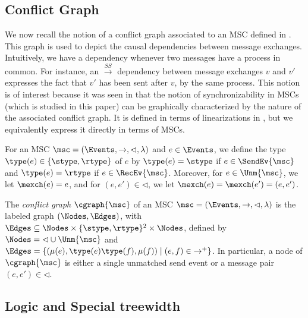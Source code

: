 \subsection{Conflict Graph}


We now recall the notion of a conflict graph associated to an MSC defined in \cite{DBLP:conf/cav/BouajjaniEJQ18}. This graph is used to depict the causal dependencies between message exchanges.  Intuitively, we have a dependency whenever
two messages have a process in common. For instance, an $\xrightarrow{SS}$
dependency between message exchanges $v$ and $v'$ expresses the fact that
$v'$ has been sent after $v$, by the same process. This notion is of interest because it was seen in \cite{DBLP:conf/cav/BouajjaniEJQ18} that the notion of synchronizability in MSCs (which is studied in this paper) can be graphically characterized by the nature of the associated conflict graph.
It is defined in terms of linearizations
in \cite{DBLP:conf/fossacs/GiustoLL20}, but we equivalently express it
directly in terms of MSCs.

For an MSC $\msc = (\Events, \rightarrow, \lhd, \lambda)$ and
$e \in \Events$, we define the type $\type(e) \in \{\stype,\rtype\}$ of $e$ by $\type(e) = \stype$ if $e \in \SendEv{\msc}$
and $\type(e) = \rtype$ if $e \in \RecEv{\msc}$.
Moreover, for $e \in \Unm{\msc}$, we let $\mexch(e) = e$,
and for $(e,e') \in \lhd$, we let $\mexch(e) = \mexch(e') = (e,e')$.


\begin{definition}
	The \emph{conflict graph} $\cgraph{\msc}$ of an MSC $\msc = (\Events, \rightarrow, \lhd, \lambda)$ is the labeled graph $(\Nodes, \Edges)$, with $\Edges \subseteq \Nodes \times \{\stype,\rtype\}^2 \times \Nodes$, defined by
	$\Nodes = {\lhd} \cup \Unm{\msc}$ and $\Edges = \{(\mu(e),\type(e)\type(f),\mu(f)) \mid (e,f) \in {\to^+}\}$.
In particular, a node of $\cgraph{\msc}$ is either a single unmatched send event or a message pair $(e,e') \in {\lhd}$.
\end{definition}

\subsection{Logic and Special treewidth}

